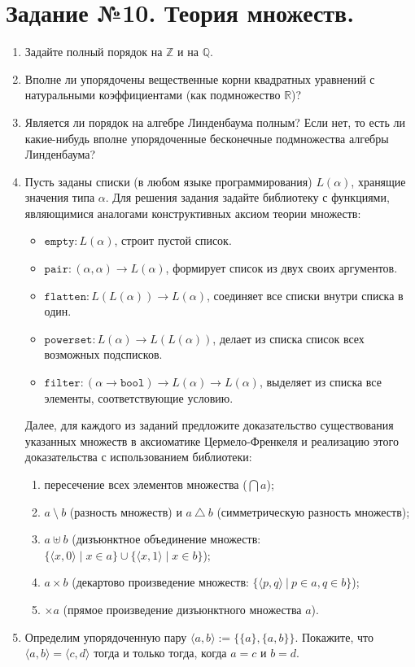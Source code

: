\documentclass[10pt,a4paper,oneside]{article}
\begin{document}
\section*{Задание №10. Теория множеств.}
\begin{enumerate}
\item Задайте полный порядок на $\mathbb{Z}$ и на $\mathbb{Q}$.
\item Вполне ли упорядочены вещественные корни квадратных уравнений с натуральными 
коэффициентами (как подмножество $\mathbb{R}$)?
\item Является ли порядок на алгебре Линденбаума полным? Если нет, то есть ли какие-нибудь
вполне упорядоченные бесконечные подмножества алгебры Линденбаума?
\item Пусть заданы списки (в любом языке программирования) $L(\alpha)$, хранящие значения типа $\alpha$.
Для решения задания задайте библиотеку с функциями, являющимися аналогами конструктивных аксиом теории множеств:
\begin{itemize}
\item $\texttt{empty}: L(\alpha)$, строит пустой список.
\item $\texttt{pair}: (\alpha, \alpha) \rightarrow L(\alpha)$, формирует список из двух своих аргументов.
\item $\texttt{flatten}: L(L(\alpha)) \rightarrow L(\alpha)$, соединяет все списки внутри списка в один.
\item $\texttt{powerset}: L(\alpha) \rightarrow L(L(\alpha))$, делает из списка список всех возможных подсписков.
\item $\texttt{filter}: (\alpha \rightarrow \texttt{bool}) \rightarrow L(\alpha) \rightarrow L(\alpha)$,
выделяет из списка все элементы, соответствующие условию.
\end{itemize}
Далее, для каждого из заданий предложите доказательство существования указанных множеств в аксиоматике
Цермело-Френкеля и реализацию этого доказательства с использованием библиотеки:
\begin{enumerate}
\item пересечение всех элементов множества ($\bigcap a$);
\item $a\ \setminus\ b$ (разность множеств) и $a\ \triangle\ b$ (симметрическую разность множеств);
\item $a \uplus b$ (дизъюнктное объединение множеств: $\{\langle x,0\rangle\mid x\in a\}\cup\{\langle x,1\rangle\mid x\in b\}$);
\item $a \times b$ (декартово произведение множеств: $\{\langle p,q\rangle\ |\ p\in a, q\in b\}$);
\item $\times a$ (прямое произведение дизъюнктного множества $a$).
\end{enumerate}
\item Определим упорядоченную пару $\langle a,b\rangle := \{\{a\},\{a,b\}\}$. Покажите, что
$\langle a,b \rangle = \langle c,d\rangle$ тогда и только тогда, когда $a = c$ и $b = d$.



\end{enumerate}
\end{document}
